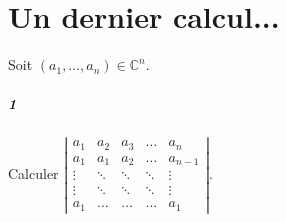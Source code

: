 \documentclass[10pt,a4paper]{article}
\begin{document}
\section{Un dernier calcul...}
Soit $(a_1, \dots, a_n) \in \mathbb{C}^n$.
\subparagraph{1}Calculer $\left| \begin{matrix}
a_1 & a_2 & a_3 & \dots & a_n \\
a_1 & a_1 & a_2 & \dots & a_{n-1} \\ 
\vdots & \ddots & \ddots & \ddots & \vdots \\
\vdots & \ddots & \ddots & \ddots & \vdots \\
a_1 & \dots & \dots & \dots & a_1 
\end{matrix}\right|$.
\end{document}
